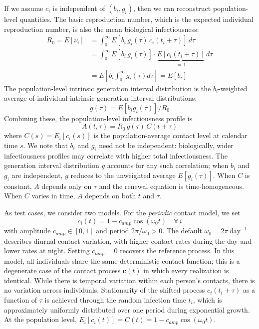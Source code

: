 If we assume $c_i$ is independent of $(b_i, g_i)$, then we can reconstruct population-level quantities. The basic reproduction number, which is the expected individual reproduction number, is also the mean biological infectiousness: 
\begin{align}
 R_0 = E[\nu_i] &= \int_0^\infty E[b_i\,g_i(\tau)\,c_i(t_i+\tau)]\,d\tau \\
  &= \int_0^\infty E[b_i\,g_i(\tau)] \cdot \underbrace{E[c_i(t_i+\tau)]}_{=\,1}\,d\tau \\ 
  &= E\left[b_i \int_0^\infty g_i(\tau) d\tau\right] = E[b_i]
\end{align}
The population-level intrinsic generation interval distribution is the $b_i$-weighted average of individual intrinsic generation interval distributions: 
\begin{equation}
    g(\tau) = E[b_i g_i(\tau)]/R_0
\end{equation}
Combining these, the population-level infectiousness profile is 
\begin{equation}
    A(t, \tau) = R_0 \, g(\tau) \, C(t + \tau)
    \label{eq:A_population}
\end{equation}
where $C(s) = E_i[c_i(s)]$ is the population-average contact level at calendar time $s$. We note that $b_i$ and $g_i$ need not be independent: biologically, wider infectiousness profiles may correlate with higher total infectiousness. The generation interval distribution $g$ accounts for any such correlation; when $b_i$ and $g_i$ are independent, $g$ reduces to the unweighted average $E[g_i(\tau)]$. When $C$ is constant, $A$ depends only on $\tau$ and the renewal equation is time-homogeneous. When $C$ varies in time, $A$ depends on both $t$ and $\tau$.

As test cases, we consider two models. For the \emph{periodic} contact model, we set
%
\begin{equation}
    c_i(t) = 1 - c_{amp}\cos(\omega_0 t) \quad \forall\,i
    \label{eq:periodic_c}
\end{equation}
%
with amplitude $c_{amp} \in [0,1]$ and period  $2\pi/\omega_0 > 0$. The default $\omega _0= 2\pi\,\text{day}^{-1}$ describes diurnal contact variation, with higher contact rates during the day and lower rates at night. Setting $c_{amp} = 0$ recovers the reference process. In this model, all individuals share the same deterministic contact function; this is a degenerate case of the contact process $\bm{c}(t)$ in which every realization is identical. While there is temporal variation within each person's contacts, there is no variation across individuals. Stationarity of the shifted process $c_i(t_i + \tau)$ as a function of $\tau$ is achieved through the random infection time $t_i$, which is approximately uniformly distributed over one period during exponential growth. At the population level, $E_i[c_i(t)] = C(t) = 1 - c_{amp} \cos(\omega_0 t)$. 

